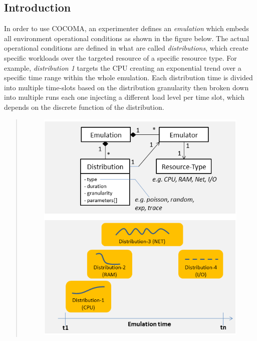 \documentclass[letterpaper,10pt,english]{sphinxhowto}
\begin{document}
\subsection{Introduction}
\label{COCOMA/01_introduction:introduction}\label{COCOMA/01_introduction::doc}
In order to use COCOMA, an experimenter defines an \emph{emulation} which embeds all environment operational conditions as shown in the figure below. The actual operational conditions are defined in what are called \emph{distributions}, which create specific workloads over the targeted resource of a specific resource type. For example, \emph{distribution 1} targets the CPU creating an exponential trend over a specific time range within the whole emulation. Each distribution time is divided into multiple time-slots based on the distribution granularity then broken down into multiple runs each one injecting a different load level per time slot, which depends on the discrete function of the distribution.
\begin{quote}
\begin{figure}[htbp]
\centering

\includegraphics{emulation2.png}
\end{figure}
\end{quote}
\end{document}

